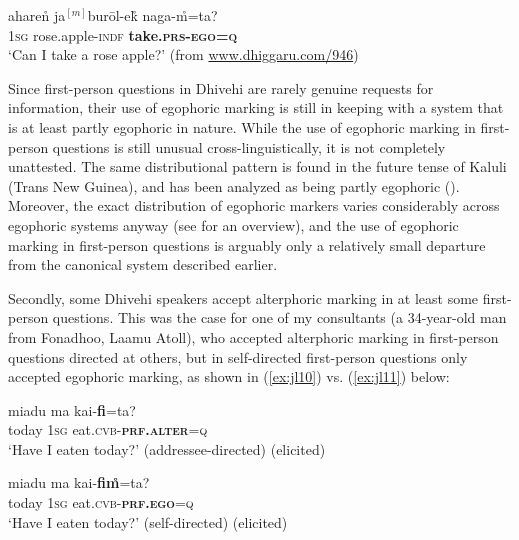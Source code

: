 \documentclass[output=paper]{langsci/langscibook}
\begin{document}
\begin{exe}
	\ex 	\label{ex:jl9}
	\gll aharen̊ ja$^{[m]}$burōl-ek̊ naga-m̊=ta?\\
	1\textsc{sg} rose.apple-\textsc{indf} \textbf{take.\textsc{prs}-\textsc{ego}=\textsc{q}}\\
	\trans ‘Can I take a rose apple?’ (from \url{www.dhiggaru.com/946})
\end{exe}
 
 Since first-person questions in Dhivehi are rarely genuine requests for information, their use of egophoric marking is still in keeping with a system that is at least partly egophoric in nature. While the use of egophoric marking in first-person questions is still unusual cross-linguistically, it is not completely unattested. The same distributional pattern is found in the future tense of Kaluli (Trans New Guinea), and has been analyzed as being partly egophoric (\citealt{SanRoqueSchieffelin2018}). Moreover, the exact distribution of egophoric markers varies considerably across egophoric systems anyway (see \citealt{SanRoque2018} for an overview), and the use of egophoric marking in first-person questions is arguably only a relatively small departure from the canonical system described earlier. 

 Secondly, some Dhivehi speakers accept alterphoric marking in at least some first-person questions. This was the case for one of my consultants (a 34-year-old man from Fonadhoo, Laamu Atoll), who accepted alterphoric marking in first-person questions directed at others, but in self-directed first-person questions only accepted egophoric marking, as shown in (\ref{ex:jl10}) vs. (\ref{ex:jl11}) below:


\begin{exe}
	\ex 	\label{ex:jl10}
	\gll miadu ma kai-\textbf{fi}=ta?\\
	today 1\textsc{sg} eat.\textsc{cvb}-\textbf{\textsc{prf}.\textsc{alter}}=\textsc{q}\\
	\trans ‘Have I eaten today?’ (addressee-directed) (elicited)
\end{exe}

\begin{exe}
	\ex 	\label{ex:jl11}
	\gll miadu ma kai-\textbf{fim̊}=ta?\\
	today 1\textsc{sg} eat.\textsc{cvb}-\textbf{\textsc{prf}.\textsc{ego}}=\textsc{q}\\
	\trans ‘Have I eaten today?’ (self-directed) (elicited)
\end{exe}
\end{document}
